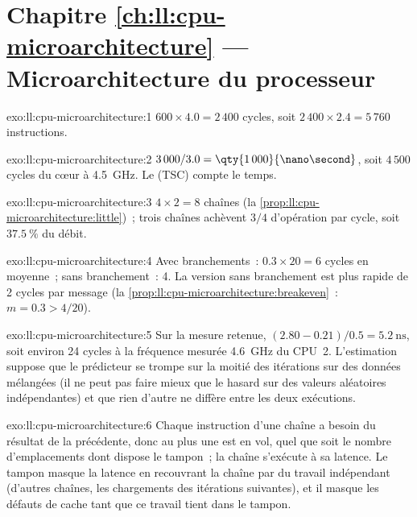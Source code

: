 \section*{Chapitre \ref{ch:ll:cpu-microarchitecture} --- Microarchitecture du processeur}

\begin{solution}{exo:ll:cpu-microarchitecture:1}
$600 \times 4.0 = 2\,400$ cycles, soit $2\,400 \times 2.4 = 5\,760$ instructions.
\end{solution}

\begin{solution}{exo:ll:cpu-microarchitecture:2}
$3\,000 / 3.0 = \qty{1\,000}{\nano\second}$, soit $4\,500$ cycles du cœur à 4.5~GHz. Le  (TSC) compte le temps.
\end{solution}

\begin{solution}{exo:ll:cpu-microarchitecture:3}
$4 \times 2 = 8$ chaînes (la \cref{prop:ll:cpu-microarchitecture:little})~; trois chaînes achèvent $3/4$ d'opération par
cycle, soit $37.5~\%$ du débit.
\end{solution}

\begin{solution}{exo:ll:cpu-microarchitecture:4}
Avec branchements~: $0.3 \times 20 = 6$ cycles en moyenne~; sans branchement~: 4. La version sans branchement est plus rapide de 2 cycles par
message (la \cref{prop:ll:cpu-microarchitecture:breakeven}~: $m = 0.3 > 4/20$).
\end{solution}

\begin{solution}{exo:ll:cpu-microarchitecture:5}
Sur la mesure retenue, $(2.80 - 0.21)/0.5 = \qty{5.2}{\nano\second}$, soit environ 24 cycles à la fréquence mesurée
4.6~GHz du CPU~2. L'estimation suppose que le prédicteur se trompe sur la moitié des itérations sur des données mélangées (il ne peut pas faire
mieux que le hasard sur des valeurs aléatoires indépendantes) et que rien d'autre ne diffère entre les deux exécutions.
\end{solution}

\begin{solution}{exo:ll:cpu-microarchitecture:6}
Chaque instruction d'une chaîne a besoin du résultat de la précédente, donc au plus une est en vol, quel que soit le nombre d'emplacements dont
dispose le tampon~; la chaîne s'exécute à sa latence. Le tampon masque la latence en recouvrant la chaîne par du travail indépendant (d'autres
chaînes, les chargements des itérations suivantes), et il masque les défauts de cache tant que ce travail tient dans le tampon.
\end{solution}

